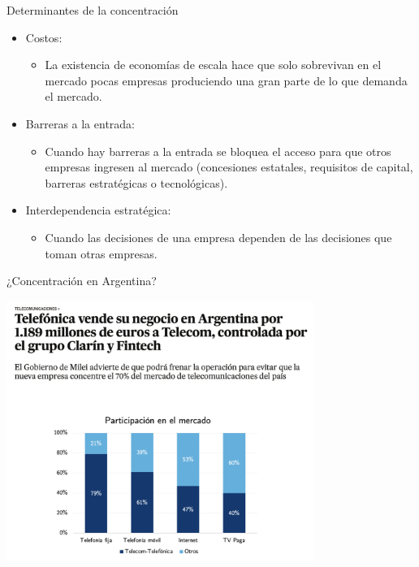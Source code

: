 \documentclass{beamer}
\begin{document}
\begin{frame}{Determinantes de la concentración}
    \begin{itemize}
        \item Costos:
            \begin{itemize}
            \item La existencia de economías de escala hace que solo sobrevivan en el mercado pocas empresas produciendo una gran parte de lo que demanda el mercado. 
            \end{itemize}
        \item Barreras a la entrada:
            \begin{itemize}
            \item Cuando hay barreras a la entrada se bloquea el acceso para que otros empresas ingresen al mercado (concesiones estatales, requisitos de capital, barreras estratégicas o tecnológicas). 
            \end{itemize}
        \item Interdependencia estratégica:
            \begin{itemize}
            \item Cuando las decisiones de una empresa dependen de las decisiones que toman otras empresas.
            \end{itemize}
    \end{itemize}
\end{frame}

\begin{frame}{¿Concentración en Argentina?}

    \centering
    \includegraphics[width=0.75\textwidth]{../Figures/M15.2.jpg}
    
\end{frame}
    
\end{document}
